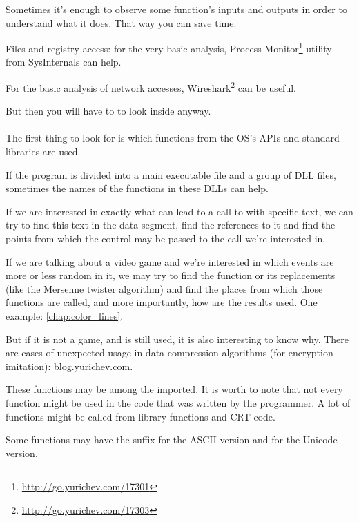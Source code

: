 
Sometimes it's enough to observe some function's inputs and outputs in order to understand what it does.
That way you can save time.

Files and registry access: 
for the very basic analysis, Process Monitor\footnote{\url{http://go.yurichev.com/17301}}
utility from SysInternals can help.

For the basic analysis of network accesses, Wireshark\footnote{\url{http://go.yurichev.com/17303}} can be useful.

But then you will have to to look inside anyway. \\
\\
The first thing to look for is which functions from the \ac{OS}'s \ac{API}s and standard libraries are used.

If the program is divided into a main executable file and a group of DLL files, sometimes the names of the functions in these DLLs can help.

If we are interested in exactly what can lead to a call to  with specific text, 
we can try to find this text in the data segment, find the references to it and find the points
from which the control may be passed to the  call we're interested in.

If we are talking about a video game and we're interested in which events are more or less random in it,
we may try to find the \rand function or its replacements (like the Mersenne twister algorithm) and find the places
from which those functions are called, and more importantly, how are the results used.
One example: \ref{chap:color_lines}. 

But if it is not a game, and \rand is still used, it is also interesting to know why.
There are cases of unexpected \rand usage in data compression algorithms (for encryption imitation):
\href{http://go.yurichev.com/17221}{blog.yurichev.com}.


These functions may be among the imported.
It is worth to note that not every function might be used in the code that was written by the programmer.
A lot of functions might be called from library functions and \ac{CRT} code.

Some functions may have the  suffix for the ASCII version and  for the Unicode version.

